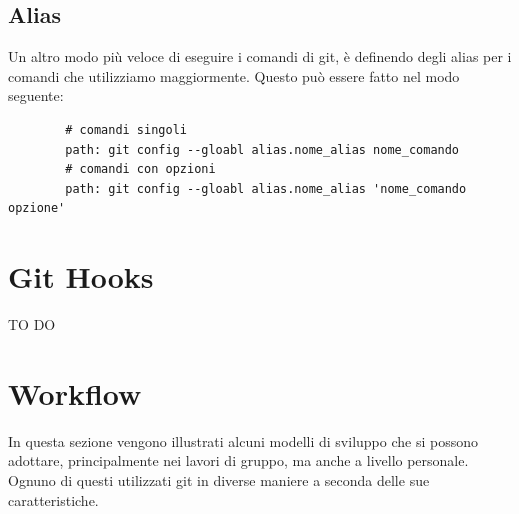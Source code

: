 	\subsection{Alias} %
	\label{sub:alias}
	Un altro modo più veloce di eseguire i comandi di git, è definendo degli alias per i comandi che utilizziamo maggiormente. Questo può essere fatto nel modo seguente:
	\begin{verbatim}
		# comandi singoli
		path: git config --gloabl alias.nome_alias nome_comando
		# comandi con opzioni
		path: git config --gloabl alias.nome_alias 'nome_comando opzione'
	\end{verbatim}


\newpage \clearpage
\section{Git Hooks} %
\label{sec:git_hooks}
TO DO






\newpage \clearpage
\section{Workflow} %
\label{sec:workflow}
In questa sezione vengono illustrati alcuni modelli di sviluppo che si possono adottare, principalmente nei lavori di gruppo, ma anche a livello personale. Ognuno di questi utilizzati git in diverse maniere a seconda delle sue caratteristiche.
